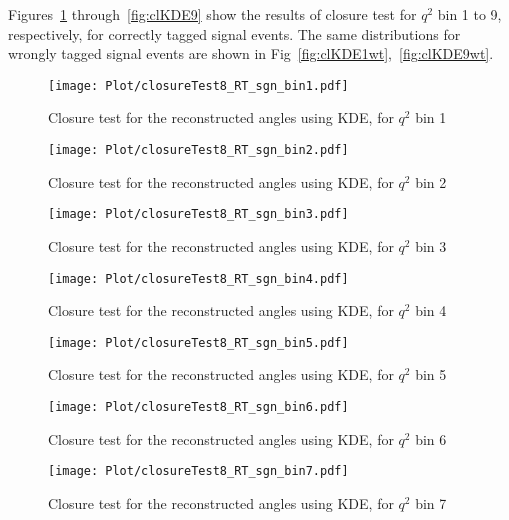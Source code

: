 Figures~\ref{fig:clKDE1} through~\ref{fig:clKDE9} show the results of
closure test for $q^2$ bin 1 to 9, respectively, for correctly tagged
signal events.  The same distributions for wrongly tagged signal
events are shown in Fig~\ref{fig:clKDE1wt},~\ref{fig:clKDE9wt}.

\begin{figure}[hbt]
    \texttt{[image: Plot/closureTest8\_RT\_sgn\_bin1.pdf]}

    \caption{Closure test for the reconstructed angles using KDE, for $q^2$ bin 1}
    \label{fig:clKDE1}
\end{figure}

\begin{figure}[hbt]
    \texttt{[image: Plot/closureTest8\_RT\_sgn\_bin2.pdf]}

    \caption{Closure test for the reconstructed angles using KDE, for $q^2$ bin 2}
    \label{fig:clKDE2}
\end{figure}

\begin{figure}[hbt]
    \texttt{[image: Plot/closureTest8\_RT\_sgn\_bin3.pdf]}

    \caption{Closure test for the reconstructed angles using KDE, for $q^2$ bin 3}
    \label{fig:clKDE3}
\end{figure}

\begin{figure}[hbt]
    \texttt{[image: Plot/closureTest8\_RT\_sgn\_bin4.pdf]}

    \caption{Closure test for the reconstructed angles using KDE, for $q^2$ bin 4}
    \label{fig:clKDE4}
\end{figure}

\begin{figure}[hbt]
    \texttt{[image: Plot/closureTest8\_RT\_sgn\_bin5.pdf]}

    \caption{Closure test for the reconstructed angles using KDE, for $q^2$ bin 5}
    \label{fig:clKDE5}
\end{figure}

\begin{figure}[hbt]
    \texttt{[image: Plot/closureTest8\_RT\_sgn\_bin6.pdf]}

    \caption{Closure test for the reconstructed angles using KDE, for $q^2$ bin 6}
    \label{fig:clKDE6}
\end{figure}

\begin{figure}[hbt]
    \texttt{[image: Plot/closureTest8\_RT\_sgn\_bin7.pdf]}

    \caption{Closure test for the reconstructed angles using KDE, for $q^2$ bin 7}
    \label{fig:clKDE7}
\end{figure}

